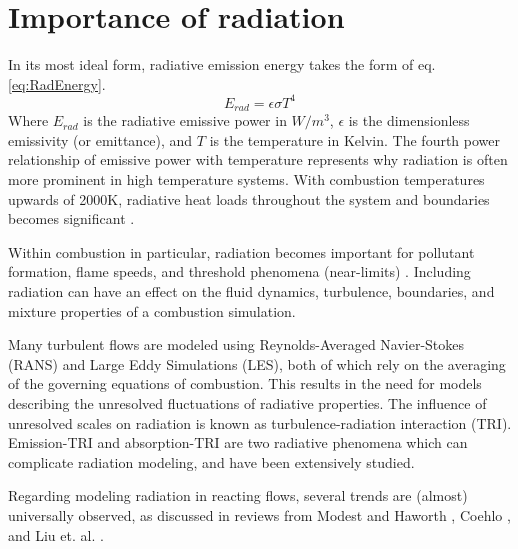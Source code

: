 \section{Importance of radiation}
In its most ideal form, radiative emission energy takes the form of eq. \ref{eq:RadEnergy}.
\begin{equation}
    E_{rad}=\epsilon{}\sigma{}T^4
    \label{eq:RadEnergy}
\end{equation}
Where $E_{rad}$ is the radiative emissive power in $W/m^3$, $\epsilon{}$ is the dimensionless emissivity (or emittance), and $T$ is the temperature in Kelvin. 
The fourth power relationship of emissive power with temperature represents why radiation is often more prominent in high temperature systems. With combustion temperatures upwards of 2000K, radiative heat loads throughout the system and boundaries becomes significant \cite{Modest2016RadiativeSystems}.

Within combustion in particular, radiation becomes important for pollutant formation, flame speeds, and threshold phenomena (near-limits) \cite{Modest2016RadiativeSystems,Coelho2018RadiativeSystems,Liu2020TheFlames}. Including radiation can have an effect on the fluid dynamics, turbulence, boundaries, and mixture properties of a combustion simulation.

Many turbulent flows are modeled using Reynolds-Averaged Navier-Stokes (RANS) and Large Eddy Simulations (LES), both of which rely on the averaging of the governing equations of combustion. This results in the need for models describing the unresolved fluctuations of radiative properties. The influence of unresolved scales on radiation is known as turbulence-radiation interaction (TRI). Emission-TRI and absorption-TRI are two radiative phenomena which can complicate radiation modeling, and have been extensively studied.

Regarding modeling radiation in reacting flows, several trends are (almost) universally observed, as discussed in reviews from Modest and Haworth \cite{Modest2016RadiativeSystems}, Coehlo \cite{Coelho2018RadiativeSystems}, and Liu et. al. \cite{Liu2020TheFlames}.

